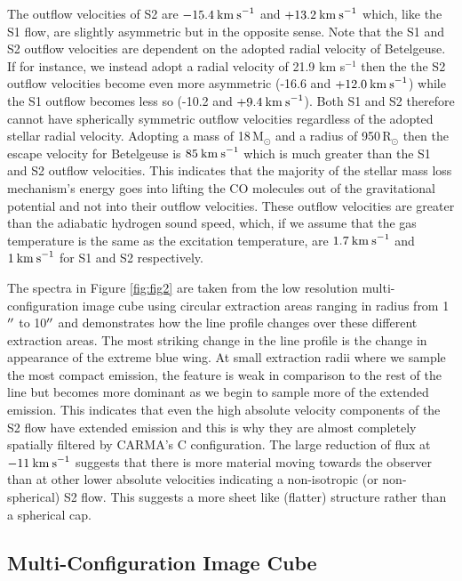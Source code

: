 \documentclass[iop]{emulateapj}
\begin{document}
The outflow velocities of S2 are $-15.4\>{\rm km\>s}^{-1}$ and $+13.2\>{\rm km\>s}^{-1}$ which, like the S1 flow, are slightly asymmetric but in the opposite sense. Note that the S1 and S2 outflow velocities are dependent on the adopted radial velocity of Betelgeuse. If for instance, we instead adopt a radial velocity of 21.9 km s${}^{-1}$ \citep{2005A&A...430..165F} then the the S2 outflow velocities become even more asymmetric (-16.6 and $+12.0\>{\rm km\>s}^{-1}$) while the S1 outflow becomes less so (-10.2 and $+9.4\>{\rm km\>s}^{-1}$). Both S1 and S2 therefore cannot have spherically symmetric outflow velocities regardless of the adopted stellar radial velocity. Adopting a mass of 18\,M$_{\odot}$ and a radius of 950\,R$_{\odot}$ \citep{2008AJ....135.1430H} then the escape velocity for Betelgeuse is $85\>{\rm km\>s}^{-1}$ which is much greater than the S1 and S2 outflow velocities. This indicates that the majority of the stellar mass loss mechanism's energy goes into lifting the CO molecules out of the gravitational potential and not into their outflow velocities. These outflow velocities are greater than the adiabatic hydrogen sound speed, which, if we assume that the gas temperature is the same as the excitation temperature, are $1.7\>{\rm km\>s}^{-1}$ and $1\>{\rm km\>s}^{-1}$ for S1 and S2 respectively. 

The spectra in Figure \ref{fig:fig2} are taken from the low resolution multi-configuration image cube using circular extraction areas ranging in radius from 1$\mbox{$^{\prime\prime}$}$ to 10$\mbox{$^{\prime\prime}$}$ and demonstrates how the line profile changes over these different extraction areas. The most striking change in the line profile is the change in appearance of the extreme blue wing. At small extraction radii where we sample the most compact emission, the feature is weak in comparison to the rest of the line but becomes more dominant as we begin to sample more of the extended emission. This indicates that even the high absolute velocity components of the S2 flow have extended emission and this is why they are almost completely spatially filtered by CARMA's C configuration. The large reduction of flux at $-11\>{\rm km\>s}^{-1}$ suggests that there is more material moving towards the observer than at other lower absolute velocities indicating a non-isotropic (or non-spherical) S2 flow. This suggests a more sheet like (flatter) structure rather than a spherical cap.

\subsection{Multi-Configuration Image Cube} \label{results2} 
\end{document}
